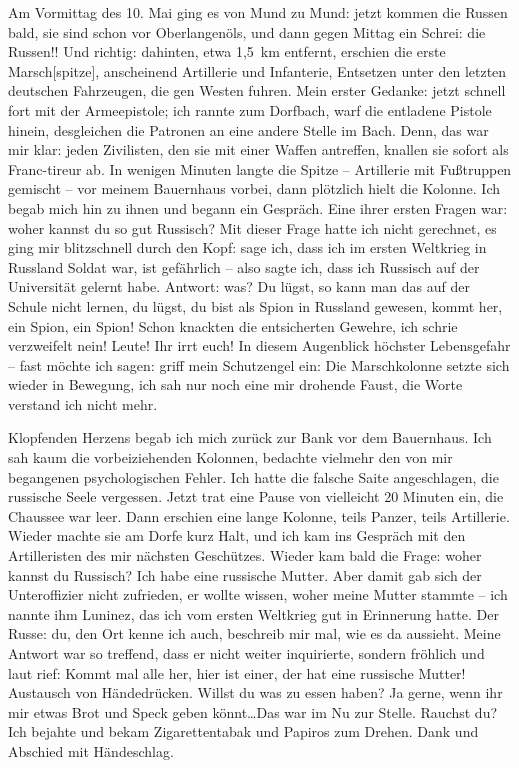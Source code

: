 \documentclass[a5paper,pagesize,10pt,twoside=true]{scrbook}
\renewcommand{\marginpar}[2][]{}
\begin{document}
Am Vormittag des 10. Mai ging es von Mund zu Mund: jetzt kommen die Russen bald, sie sind schon vor Oberlangenöls, und dann gegen Mittag ein Schrei: die Russen!! Und richtig: dahinten, etwa 1,5~km entfernt, erschien die erste Marsch[spitze], anscheinend Artillerie und \marginpar{71} Infanterie, Entsetzen unter den letzten deutschen Fahrzeugen, die gen Westen fuhren. Mein erster Gedanke: jetzt schnell fort mit der Armeepistole; ich rannte zum Dorfbach, warf die entladene Pistole hinein, desgleichen die Patronen an eine andere Stelle im Bach. Denn, das war mir klar: jeden Zivilisten, den sie mit einer Waffen antreffen, knallen sie sofort als Franc-tireur ab. In wenigen Minuten langte die Spitze -- Artillerie mit Fußtruppen gemischt -- vor meinem Bauernhaus vorbei, dann plötzlich hielt die Kolonne. Ich begab mich hin zu ihnen und begann ein Gespräch. Eine ihrer ersten Fragen war: woher kannst du so gut Russisch? Mit dieser Frage hatte ich nicht gerechnet, es ging mir blitzschnell durch den Kopf: sage ich, dass ich im ersten Weltkrieg in Russland Soldat war, ist gefährlich -- also sagte ich, dass ich Russisch auf der Universität gelernt habe. Antwort: was? Du lügst, so kann man das auf der Schule nicht lernen, du lügst, du bist als Spion in Russland gewesen, kommt her, ein Spion, ein Spion! Schon knackten die entsicherten Gewehre, ich schrie verzweifelt nein! Leute! Ihr irrt euch! In diesem Augenblick höchster Lebensgefahr -- fast möchte ich sagen: griff mein Schutzengel ein: Die Marschkolonne \marginpar{72} setzte sich wieder in Bewegung, ich sah nur noch eine mir drohende Faust, die Worte verstand ich nicht mehr.

Klopfenden Herzens begab ich mich zurück zur Bank vor dem Bauernhaus. Ich sah kaum die vorbeiziehenden Kolonnen, bedachte vielmehr den von mir begangenen psychologischen Fehler. Ich hatte die falsche Saite angeschlagen, die russische Seele vergessen. Jetzt trat eine Pause von vielleicht 20 Minuten ein, die Chaussee war leer. Dann erschien eine lange Kolonne, teils Panzer, teils Artillerie. Wieder machte sie am Dorfe kurz Halt, und ich kam ins Gespräch mit den Artilleristen des mir nächsten Geschützes. Wieder kam bald die Frage: woher kannst du Russisch? Ich habe eine russische Mutter. Aber damit gab sich der Unteroffizier nicht zufrieden, er wollte wissen, woher meine Mutter stammte -- ich nannte ihm Luninez, das ich vom ersten Weltkrieg gut in Erinnerung hatte. Der Russe: du, den Ort kenne ich auch, beschreib mir mal, wie es da aussieht. Meine Antwort war so treffend, dass er nicht weiter inquirierte, sondern fröhlich und laut rief: Kommt mal alle her, hier ist einer, der hat eine russische Mutter! Austausch von Händedrücken. Willst du was \marginpar{73} zu essen haben? Ja gerne, wenn ihr mir etwas Brot und Speck geben könnt\dots Das war im Nu zur Stelle. Rauchst du? Ich bejahte und bekam Zigarettentabak und Papiros zum Drehen. Dank und Abschied mit Händeschlag.
\end{document}
